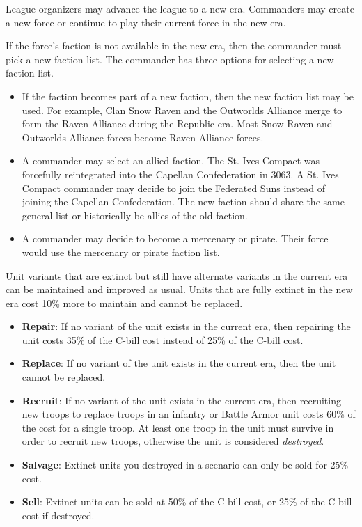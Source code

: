 League organizers may advance the league to a new era.
Commanders may create a new force or continue to play their current force in the new era.

If the force's faction is not available in the new era, then the commander must pick a new faction list.
The commander has three options for selecting a new faction list.

\begin{itemize}

\item If the faction becomes part of a new faction, then the new faction list may be used.
For example, Clan Snow Raven and the Outworlds Alliance merge to form the Raven Alliance during the Republic era.
Most Snow Raven and Outworlds Alliance forces become Raven Alliance forces.

\item A commander may select an allied faction.
The St. Ives Compact was forcefully reintegrated into the Capellan Confederation in 3063.
A St. Ives Compact commander may decide to join the Federated Suns instead of joining the Capellan Confederation.
The new faction should share the same general list or historically be allies of the old faction.

\item A commander may decide to become a mercenary or pirate.
Their force would use the mercenary or pirate faction list.

\end{itemize}

Unit variants that are extinct but still have alternate variants in the current era can be maintained and improved as usual.
Units that are fully extinct in the new era cost 10\% more to maintain and cannot be replaced.

\begin{itemize}

\item {\bfseries Repair}: If no variant of the unit exists in the current era, then repairing the unit costs 35\% of the C-bill cost instead of 25\% of the C-bill cost.

\item {\bfseries Replace}: If no variant of the unit exists in the current era, then the unit cannot be replaced.

\item {\bfseries Recruit}: If no variant of the unit exists in the current era, then recruiting new troops to replace troops in an infantry or Battle Armor unit costs 60\% of the cost for a single troop.
At least one troop in the unit must survive in order to recruit new troops, otherwise the unit is considered \emph{destroyed}.

\item {\bfseries Salvage}: Extinct units you destroyed in a scenario can only be sold for 25\% cost.

\item {\bfseries Sell}: Extinct units can be sold at 50\% of the C-bill cost, or 25\% of the C-bill cost if destroyed.

\end{itemize}
